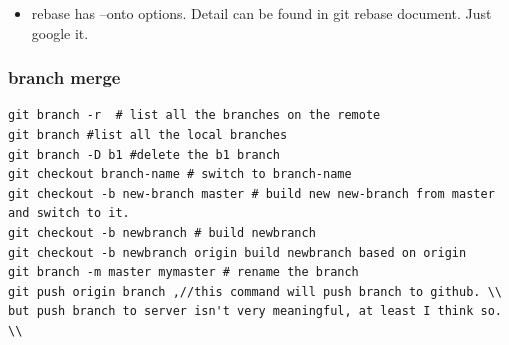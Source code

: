 \documentclass[a4paper,12pt,twoside]{book}
\begin{document}
\begin{itemize}
\begin{itemize}
\item rebase has --onto options. Detail can be found in git rebase document. Just google it. 








\end{itemize}

\subsubsection{branch merge}

\begin{verbatim}
git branch -r  # list all the branches on the remote
git branch #list all the local branches
git branch -D b1 #delete the b1 branch
git checkout branch-name # switch to branch-name
git checkout -b new-branch master # build new new-branch from master and switch to it.
git checkout -b newbranch # build newbranch
git checkout -b newbranch origin build newbranch based on origin
git branch -m master mymaster # rename the branch
git push origin branch ,//this command will push branch to github. \\
but push branch to server isn't very meaningful, at least I think so. \\
\end{verbatim}


\end{itemize}
\end{document}
